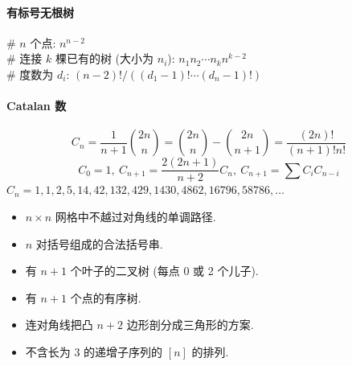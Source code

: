	\paragraph{有标号无根树}
		\# $n$ 个点: $n^{n-2}$ \\
		\# 连接 $k$ 棵已有的树 (大小为 $n_i$): $n_1n_2\cdots n_k n^{k-2}$ \\
		\# 度数为 $d_i$: $(n-2)! / ((d_1-1)! \cdots (d_n-1)!)$

	\paragraph{Catalan 数}
		\[ C_n=\frac{1}{n+1}\binom{2n}{n}= \binom{2n}{n}-\binom{2n}{n+1} = \frac{(2n)!}{(n+1)!n!} \]
		\[ C_0=1,\ C_{n+1} = \frac{2(2n+1)}{n+2}C_n,\ C_{n+1}=\sum C_iC_{n-i} \]
		${C_n = 1, 1, 2, 5, 14, 42, 132, 429, 1430, 4862, 16796, 58786, \dots}$
		\begin{itemize}[noitemsep]
			\item $n\times n$ 网格中不越过对角线的单调路径.
			\item $n$ 对括号组成的合法括号串.
			\item 有 $n+1$ 个叶子的二叉树 (每点 0 或 2 个儿子).
			\item 有 $n+1$ 个点的有序树.
			\item 连对角线把凸 $n+2$ 边形剖分成三角形的方案.
			\item 不含长为 3 的递增子序列的 $[n]$ 的排列.
		\end{itemize}
